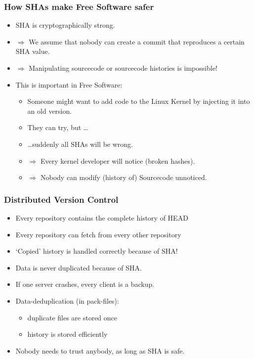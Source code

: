 \documentclass[ignoreframetext,envcountsect]{beamer}
\newif\ifsnop\snoptrue
\newcommand{\bi}{\begin{itemize}}
\newcommand{\ei}{\end{itemize}}
\newcommand{\cemph}[1]{{\color{red}#1}}
\begin{document}
\ifsnop
\begin{frame}
\frametitle{How SHAs make Free Software safer}
\bi
\item
  SHA is cryptographically strong.
\item[$\Rightarrow$]
  We assume that nobody can create a commit that reproduces a certain SHA value.
\item[$\Rightarrow$]
  Manipulating sourcecode or sourcecode histories is impossible!
\medskip
\item
  This is important in Free Software:
  \bi
  \item Someone might want to add code to the Linux Kernel by injecting it into an old version.
  \smallskip
  \item They can try, but \ldots
  \item \ldots suddenly all SHAs will be wrong.
  \smallskip
  \item[$\Rightarrow$] Every kernel developer will notice (broken hashes).
  \smallskip
  \item[$\Rightarrow$] Nobody can modify (history of) Sourcecode unnoticed.
  \ei
\ei
\end{frame}
\fi

\ifsnop
\begin{frame}
\frametitle{Distributed Version Control}
\bi
\item
  Every repository contains the complete history of HEAD
\item
  Every repository can fetch from every other repository
\item
  `Copied' history is handled correctly because of SHA!
\item
  Data is never duplicated because of SHA.
\item
  If one server crashes, every client is a backup.
\item
  Data-\cemph{deduplication} (in pack-files):
  \bi
  \item duplicate files are stored once
	\item history is stored efficiently
  \ei
\item
  Nobody needs to trust anybody, as long as SHA is safe.
\ei
\end{frame}
\fi
\end{document}
